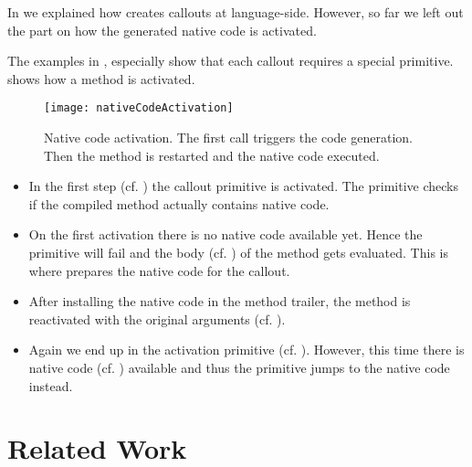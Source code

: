 
In  we explained how \NB creates \FFI callouts at language-side.
However, so far we left out the part on how the generated native code is activated.

The examples in , especially  show that each \NBFFI callout requires a special primitive.
 shows how a \NB method is activated.


\begin{figure}[h]
	\centering
	\texttt{[image: nativeCodeActivation]}
	\caption[\NB Native Code Activation]{Native code activation. The first call triggers the code generation. Then the method is restarted and the native code executed.}
\end{figure}

\begin{itemize}
\item In the first step (cf. ) the \NB callout primitive is activated.
	The primitive checks if the compiled method actually contains native code.
\item On the first activation there is no native code available yet.
	Hence the primitive will fail and the \ST body (cf. ) of the \NB method gets evaluated.
	This is where \NB prepares the native code for the \FFI callout.
\item After installing the native code in the method trailer, the \NB method is reactivated with the original arguments (cf. ).
\item Again we end up in the \NB activation primitive (cf. ).
	However, this time there is native code (cf. ) available and thus the primitive jumps to the native code instead.
\end{itemize}

\section{Related Work}

